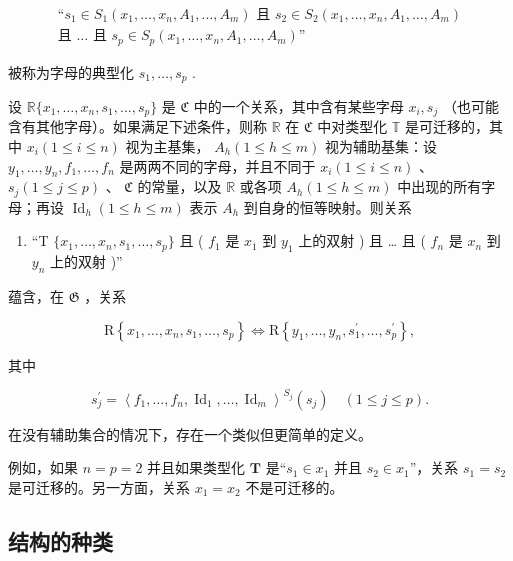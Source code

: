 \[
\begin{array}{c}
\text{``}s_{1} \in S_{1}(x_{1}, \ldots, x_{n}, A_{1}, \ldots, A_{m})
\text{ 且 }s_{2} \in S_{2}(x_{1}, \ldots, x_{n}, A_{1}, \ldots, A_{m}) \\
\text{且 }\ldots\text{ 且 }s_{p} \in S_{p}(x_{1}, \ldots, x_{n}, A_{1}, \ldots, A_{m})\text{''}
\end{array}
\]

被称为字母的典型化 \(s_{1}, \ldots, s_{p}\) .

设 \(\mathbb{R}\{x_1, \ldots, x_n, s_1, \ldots, s_p\}\) 是 \(\mathfrak{C}\) 中的一个关系，其中含有某些字母 \(x_i, s_j\) （也可能含有其他字母）。如果满足下述条件，则称 \(\mathbb{R}\) 在 \(\mathfrak{C}\) 中对类型化 \(\mathbb{T}\) 是可迁移的，其中 \(x_i (1 \leqslant i \leqslant n)\) 视为主基集， \(A_h (1 \leqslant h \leqslant m)\) 视为辅助基集：设 \(y_1, \ldots, y_n, f_1, \ldots, f_n\) 是两两不同的字母，并且不同于 \(x_i (1 \leqslant i \leqslant n)\) 、 \(s_j (1 \leqslant j \leqslant p)\) 、 \(\mathfrak{C}\) 的常量，以及 \(\mathbb{R}\) 或各项 \(A_h (1 \leqslant h \leqslant m)\) 中出现的所有字母；再设 \(\operatorname{Id}_h (1 \leqslant h \leqslant m)\) 表示 \(A_h\) 到自身的恒等映射。则关系

\begin{enumerate}
\def\labelenumi{(\arabic{enumi})}
\tightlist
\item
  “T \(\{x_{1},\ldots,x_{n},s_{1},\ldots,s_{p}\}\) 且 ( \(f_{1}\) 是 \(x_{1}\) 到 \(y_{1}\) 上的双射 ) 且 \ldots{} 且 ( \(f_{n}\) 是 \(x_{n}\) 到 \(y_{n}\) 上的双射 )''
\end{enumerate}

蕴含，在 \(\mathfrak{G}\) ，关系

\[
\mathrm{R} \left\{x _ {1}, \dots , x _ {n}, s _ {1}, \dots , s _ {p} \right\} \Longleftrightarrow \mathrm{R} \left\{y _ {1}, \dots , y _ {n}, s _ {1} ^ {\prime}, \dots , s _ {p} ^ {\prime} \right\},\tag{2}
\]

其中

\[
s _ {j} ^ {\prime} = \left\langle f _ {1}, \dots , f _ {n}, \operatorname{Id} _ {1}, \dots , \operatorname{Id} _ {m} \right\rangle^ {S_j} (s _ {j}) \quad (1 \leqslant j \leqslant p).\tag{3}
\]

在没有辅助集合的情况下，存在一个类似但更简单的定义。

例如，如果 \(n = p = 2\) 并且如果类型化 \(\mathbf{T}\) 是“\(s_1 \in x_1\) 并且 \(s_2 \in x_1\)''，关系 \(s_1 = s_2\) 是可迁移的。另一方面，关系 \(x_1 = x_2\) 不是可迁移的。

\subsection{结构的种类}

